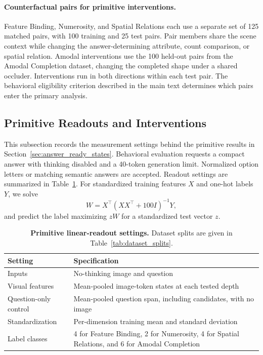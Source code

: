 \documentclass{article} %
\begin{document}
\paragraph{Counterfactual pairs for primitive interventions.}
Feature Binding, Numerosity, and Spatial Relations each use a separate set of 125 matched pairs, with 100 training and 25 test pairs. Pair members share the scene context while changing the answer-determining attribute, count comparison, or spatial relation. Amodal interventions use the 100 held-out pairs from the Amodal Completion dataset, changing the completed shape under a shared occluder. Interventions run in both directions within each test pair. The behavioral eligibility criterion described in the main text determines which pairs enter the primary analysis.

\subsection{Primitive Readouts and Interventions}
\label{app:primitive_analysis}

This subsection records the measurement settings behind the primitive results in Section~\ref{sec:answer_ready_states}. Behavioral evaluation requests a compact answer with thinking disabled and a 40-token generation limit. Normalized option letters or matching semantic answers are accepted. Readout settings are summarized in Table~\ref{tab:primitive_readout_settings}. For standardized training features $X$ and one-hot labels $Y$, we solve
\[
W=X^\top(XX^\top+100I)^{-1}Y,
\]
and predict the label maximizing $zW$ for a standardized test vector $z$.

\begin{table}[H]
\centering\small
\renewcommand{\arraystretch}{1.05}
\setlength{\tabcolsep}{4pt}
\caption{\textbf{Primitive linear-readout settings.} Dataset splits are given in Table~\ref{tab:dataset_splits}.}
\label{tab:primitive_readout_settings}
\begin{tabular*}{\textwidth}{@{\extracolsep{\fill}}p{}p{}@{}}
\toprule
Setting & Specification \\
\midrule
Inputs & No-thinking image and question \\
Visual features & Mean-pooled image-token states at each tested depth \\
Question-only control & Mean-pooled question span, including candidates, with no image \\
Standardization & Per-dimension training mean and standard deviation \\
Label classes & 4 for Feature Binding, 2 for Numerosity, 4 for Spatial Relations, and 6 for Amodal Completion \\
\bottomrule
\end{tabular*}
\end{table}
\end{document}
